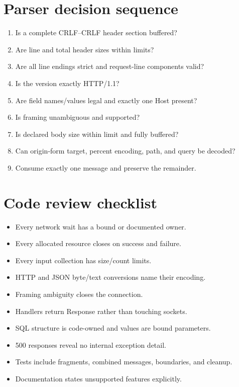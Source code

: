 \section{Parser decision sequence}

\begin{enumerate}
  \item Is a complete CRLF--CRLF header section buffered?
  \item Are line and total header sizes within limits?
  \item Are all line endings strict and request-line components valid?
  \item Is the version exactly HTTP/1.1?
  \item Are field names/values legal and exactly one Host present?
  \item Is framing unambiguous and supported?
  \item Is declared body size within limit and fully buffered?
  \item Can origin-form target, percent encoding, path, and query be decoded?
  \item Consume exactly one message and preserve the remainder.
\end{enumerate}

\section{Code review checklist}

\begin{itemize}
  \item Every network wait has a bound or documented owner.
  \item Every allocated resource closes on success and failure.
  \item Every input collection has size/count limits.
  \item HTTP and JSON byte/text conversions name their encoding.
  \item Framing ambiguity closes the connection.
  \item Handlers return Response rather than touching sockets.
  \item SQL structure is code-owned and values are bound parameters.
  \item 500 responses reveal no internal exception detail.
  \item Tests include fragments, combined messages, boundaries, and cleanup.
  \item Documentation states unsupported features explicitly.
\end{itemize}
